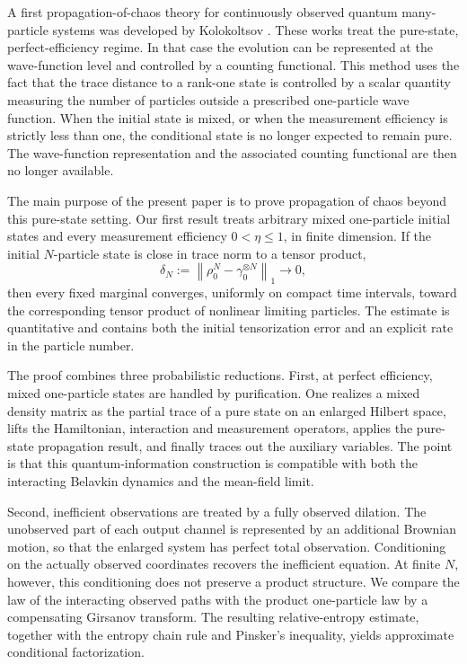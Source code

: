 \documentclass[10pt,a4paper,reqno]{amsart}
\numberwithin{equation}{section}
\theoremstyle{plain}
\theoremstyle{definition}
\theoremstyle{remark}
\newcommand{\1}{\mathbf 1}
\begin{document}
A first propagation-of-chaos theory for continuously observed quantum
many-particle systems was developed by Kolokoltsov
\cite{kolokoltsov2021,kolokoltsov2022}.  These works treat the pure-state,
perfect-efficiency regime.  In that case the evolution can be represented at
the wave-function level and controlled by a counting functional.  This method
uses the fact that the trace distance to a rank-one state is controlled by a
scalar quantity measuring the number of particles outside a prescribed
one-particle wave function.  When the initial state is mixed, or when the
measurement efficiency is strictly less than one, the conditional state is no
longer expected to remain pure.  The wave-function representation and the
associated counting functional are then no longer available.

The main purpose of the present paper is to prove propagation of chaos beyond
this pure-state setting.  Our first result treats arbitrary mixed one-particle
initial states and every measurement efficiency \(0<\eta\le1\), in finite
dimension.  If the initial \(N\)-particle state is close in trace norm to a
tensor product,
\[
  \delta_N
  :=
  \left\|
    \rho_0^N-\gamma_0^{\otimes N}
  \right\|_1
  \longrightarrow0,
\]
then every fixed marginal converges, uniformly on compact time intervals,
toward the corresponding tensor product of nonlinear limiting particles.  The
estimate is quantitative and contains both the initial tensorization error and
an explicit rate in the particle number.

The proof combines three probabilistic reductions.  First, at perfect
efficiency, mixed one-particle states are handled by purification.  One
realizes a mixed density matrix as the partial trace of a pure state on an
enlarged Hilbert space, lifts the Hamiltonian, interaction and measurement
operators, applies the pure-state propagation result, and finally traces out
the auxiliary variables.  The point is that this quantum-information
construction is compatible with both the interacting Belavkin dynamics and the
mean-field limit.

Second, inefficient observations are treated by a fully observed dilation.  The
unobserved part of each output channel is represented by an additional
Brownian motion, so that the enlarged system has perfect total observation.
Conditioning on the actually observed coordinates recovers the inefficient
equation.  At finite \(N\), however, this conditioning does not preserve a
product structure.  We compare the law of the interacting observed paths with
the product one-particle law by a compensating Girsanov transform.  The
resulting relative-entropy estimate, together with the entropy chain rule and
Pinsker's inequality, yields approximate conditional factorization.
\end{document}
